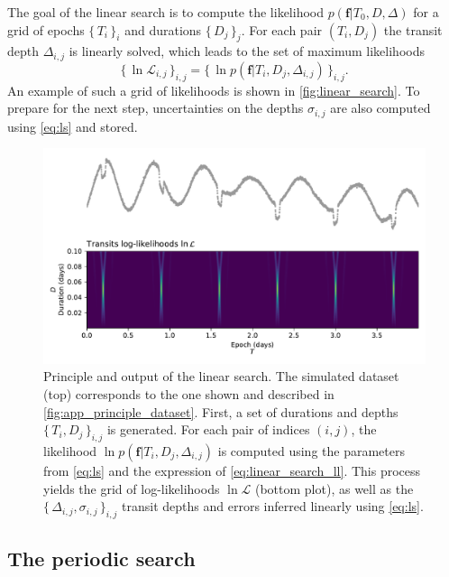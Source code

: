 \documentclass[modern,linenumbers]{aastex631}
\newcommand{\set}[1]{\{\,#1\,\}}
\begin{document}
The goal of the linear search is to compute the likelihood $p(\bm{f} \vert T_0 , D, \Delta)$ for a grid of epochs $\set{T_i}_i$ and durations $\set{D_j}_j$. For each pair $(T_i, D_j)$ the transit depth $\Delta_{i, j}$ is linearly solved, which leads to the set of maximum likelihoods
\begin{equation*}
    \set{\ln\mathcal{L}_{i,j}}_{i, j} = \set{\ln p(\bm{f} \vert T_i ,D_j, \Delta_{i, j})}_{i, j}.
\end{equation*}
An example of such a grid of likelihoods is shown in \autoref{fig:linear_search}. To prepare for the next step, uncertainties on the depths $\sigma_{i,j}$ are also computed using \autoref{eq:ls} and stored.
\begin{figure}[H]
    \begin{centering}
        \includegraphics[width=\linewidth]{../workflows/principle/figures/principle_linear_search.pdf}
        \caption{Principle and output of the linear search. The simulated dataset (top) corresponds to the one shown and described in \autoref{fig:app_principle_dataset}. First, a set of durations and depths $\set{T_i, D_j}_{i,j}$ is generated. For each pair of indices $(i,j)$, the likelihood $\ln p(\bm{f} \vert T_i ,D_j, \Delta_{i,j})$ is computed using the parameters from \autoref{eq:ls} and the expression of \autoref{eq:linear_search_ll}. This process yields the grid of log-likelihoods $\ln\mathcal{L}$ (bottom plot), as well as the $\set{\Delta_{i,j}, \sigma_{i,j}}_{i, j}$ transit depths and errors inferred linearly using \autoref{eq:ls}.}
        \label{fig:linear_search}
    \end{centering}
\end{figure}

\subsection{The periodic search}\label{periodic_search}
\end{document}
